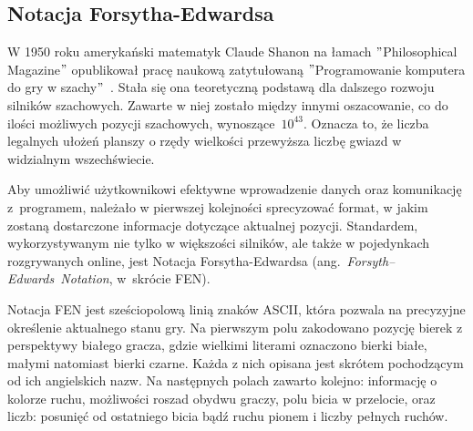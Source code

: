 \subsection{Notacja Forsytha-Edwardsa}
\label{subsec:notacja-fen}


W 1950 roku amerykański matematyk Claude Shanon na łamach \("\)Philosophical Magazine\("\) opublikował pracę naukową zatytułowaną \("\)Programowanie komputera do gry w szachy\("\)~\cite*{Shannon1950XXIIPA}.
Stała się ona teoretyczną podstawą dla dalszego rozwoju silników szachowych.
Zawarte w niej zostało między innymi oszacowanie, co do ilości możliwych pozycji szachowych, wynoszące~$10^{43}$.
Oznacza to, że liczba legalnych ułożeń planszy o rzędy wielkości przewyższa liczbę gwiazd w widzialnym wszechświecie.

Aby umożliwić użytkownikowi efektywne wprowadzenie danych oraz komunikację z~programem, należało w pierwszej kolejności sprecyzować format, w jakim zostaną dostarczone informacje dotyczące aktualnej pozycji.
Standardem, wykorzystywanym nie tylko w większości silników, ale także w pojedynkach rozgrywanych online, jest Notacja Forsytha-Edwardsa (ang.~\emph{Forsyth–Edwards~Notation}, w~skrócie FEN).

Notacja FEN jest sześciopolową linią znaków ASCII, która pozwala na precyzyjne określenie aktualnego stanu gry.
Na pierwszym polu zakodowano pozycję bierek z perspektywy białego gracza, gdzie wielkimi literami oznaczono bierki białe, małymi natomiast bierki czarne.
Każda z nich opisana jest skrótem pochodzącym od ich angielskich nazw.
Na następnych polach zawarto kolejno: informację o kolorze ruchu, możliwości roszad obydwu graczy, polu bicia w przelocie, oraz liczb: posunięć od ostatniego bicia bądź ruchu pionem i liczby pełnych ruchów.

